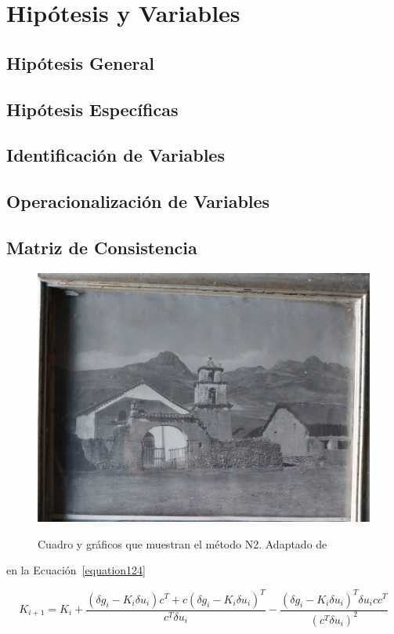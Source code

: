 \section{Hipótesis y Variables}

\subsection{Hipótesis General}

\subsection{Hipótesis Específicas}

\subsection{Identificación de Variables}

\subsection{Operacionalización de Variables}

\subsection{Matriz de Consistencia}

\lipsum[17]

\lipsum[18]

\begin{figure}[!ht]
  \caption{Cuadro y gráficos que muestran el método N2. Adaptado de \cite{deWaal2009}}
  \includegraphics[scale=0.36]{F_Figures/15_Chapter VI/Cap6_Imagen1.jpeg}
	\label{Cap3_Figura3}
\end{figure}

\lipsum[19] en la Ecuación~\ref{equation124}


\begin{equation}\label{equation124}
  K_{i+1}=K_{i}+\frac{\left ( \delta g_{i}-K_{i}\delta u_{i} \right )c^{T}+c\left ( \delta g_{i}-K_{i}\delta u_{i} \right )^{T}}{c^{T}\delta u_i}-\frac{\left ( \delta g_{i}-K_{i}\delta u_{i} \right )^{T}\delta u_{i} c c^{T}}{\left ( c^{T}\delta u_{i} \right )^{2}}
\end{equation}

